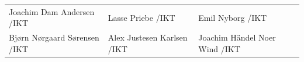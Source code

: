 \vspace{10pt}
\begin{minipage}[l]{\textwidth}
\tabulinesep=25pt
\begin{tabu} to \textwidth{X[l]X[l]X[l]}
\makebox[\linewidth]{\hrulefill}\newline Joachim Dam Andersen     /IKT  
&\makebox[\linewidth]{\hrulefill}\newline Lasse Priebe             /IKT 
&\makebox[\linewidth]{\hrulefill}\newline Emil Nyborg              /IKT\\
\makebox[\linewidth]{\hrulefill}\newline Bjørn Nørgaard Sørensen  /IKT  
&\makebox[\linewidth]{\hrulefill}\newline Alex Justesen Karlsen    /IKT 
&\makebox[\linewidth]{\hrulefill}\newline Joachim Händel Noer Wind /IKT
\end{tabu}
\end{minipage}